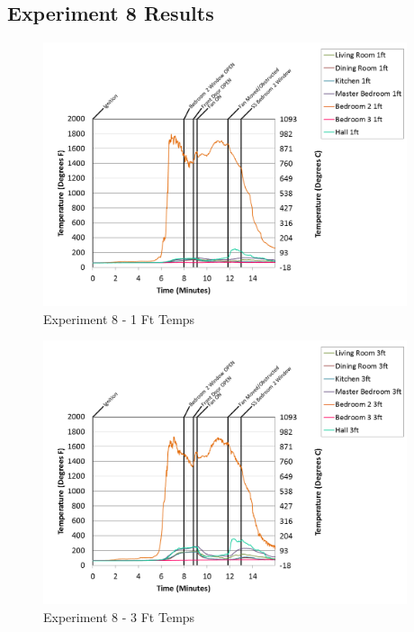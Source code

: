 \documentclass{article}
\begin{document}
\begin{appendices}
\clearpage
\clearpage		\large
\subsection{Experiment 8 Results} \label{App:Exp8Results} 

\begin{figure}[h!]
	\centering
	\includegraphics[height=3.05in]{0_Images/Results_Charts/Exp_8_Charts/1FtTemps.png}
	\caption{Experiment 8 - 1 Ft Temps}
\end{figure}


\begin{figure}[h!]
	\centering
	\includegraphics[height=3.05in]{0_Images/Results_Charts/Exp_8_Charts/3FtTemps.png}
	\caption{Experiment 8 - 3 Ft Temps}
\end{figure}

\clearpage


\end{appendices}
\end{document}
